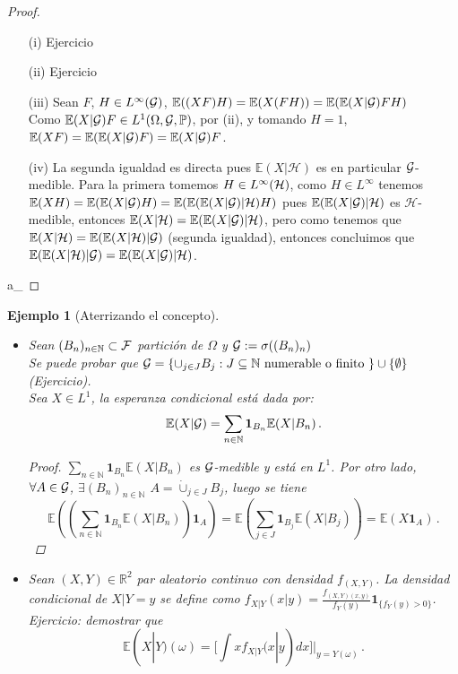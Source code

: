 \documentclass[letterpaper,11pt]{article} %
\theoremstyle{defbreak}
\newtheorem{example}{Ejemplo}[subsection]
\theoremstyle{propbreak}
\theoremstyle{remark}
\theoremstyle{break}
\def\R{\mathbb{R}}
\def\E{\mathbb{E}}
\def\P{\mathbb{P}}
\def\N{\mathbb{N}}
\def\ejercicio{\color{blue}Ejercicio\color{black}}
\def\beforeitemize{\leavevmode \vspace{-0.5\baselineskip}}
\def\gris{\color{mygray}}
\def\negro{\color{black}}
\def\findem{\null\hfill\color{white}a\color{black}_\square}
\begin{document}
\begin{proof}
\beforeitemize
\begin{enumerate} \gris
    \item[(i)] \ejercicio \gris
    \item[(ii)] \ejercicio \gris
    \item[(iii)] Sean $F$, $H\in L^\infty(\mathcal{G})$, $\E((X F) H)=\E(X(FH))=\E(\E(X|\G)F H)$
    \\ Como $\E(X|\G)F \in L^1(\Omega,\G,\P)$, por (ii), y tomando $H=1$,  $\E(X F)=\E(\E(X|\G)F)=\E(X|\G)F$.
    \item[(iv)] La segunda igualdad es directa pues $\E(X|\mathcal{H})$ es en particular $\mathcal{G}$-medible. Para la primera tomemos $H\in L^\infty(\mathcal{H})$, como $H\in L^\infty$ tenemos $\E(XH)=\E(\E(X|\G)H)=\E(\E(\E(X|\G)|\mathcal{H})H)$ pues $\E(\E(X|\G)|\mathcal{H})$ es $\mathcal{H}$-medible, entonces $\E(X|\mathcal{H})=\E(\E(X|\G)|\mathcal{H})$, pero como tenemos que $\E(X|\mathcal{H})=\E(\E(X|\mathcal{H})|\G)$ (segunda igualdad), entonces concluimos que $\E(\E(X|\mathcal{H})|\G)=\E(\E(X|\G)|\mathcal{H})$.
\end{enumerate}
\findem
\end{proof}
\begin{example}[Aterrizando el concepto]
\beforeitemize
\begin{itemize}
    \item Sean $(B_n)_{n\in\N}\subset\F$ partición de $\Omega$ y $\mathcal{G}:=\sigma((B_n)_n)$
    \\ Se puede probar que $\G=\{\cup_{j\in J}B_j:J\subseteq\N\mbox{ numerable o finito }\}\cup\{\emptyset\}$ (\ejercicio).
    \\ Sea $X\in L^1$, la esperanza condicional está dada por:
    $$ \E(X|\G)=\displaystyle\sum_{n\in\N}\mathbf{1}_{B_n}\E(X|B_n) \, .$$
    \begin{proof} \gris
    $\displaystyle\sum_{n\in\N}\mathbf{1}_{B_n}\E(X|B_n)$ es $\mathcal{G}$-medible y está en $L^1$. Por otro lado, $\forall A\in\mathcal{G}$, $\exists (B_n)_{n\in\N}$ $A=\displaystyle \dot\cup_{j\in J}B_j$, luego se tiene
    $$ \E((\displaystyle\sum_{n\in\N}\mathbf{1}_{B_n}\E(X|B_n))\mathbf{1}_A)=\E(\sum_{j\in J}\mathbf{1}_{B_j}\E(X|B_j))=\E(X \mathbf{1}_A) \, .$$
    \negro \end{proof}
    \item Sean $(X,Y)\in\R^2$ par aleatorio continuo con densidad $f_{(X,Y)}$. La densidad condicional de $X|Y=y$ se define como $\displaystyle f_{X|Y}(x|y) = \frac{f_{(X,Y)(x,y)}}{f_Y(y)}\mathbf{1}_{\{f_Y(y)>0\}}$.
    \\ \ejercicio: demostrar que 
    $$ \E(X|Y)(\omega) = [\displaystyle\int x f_{X|Y}(x|y)dx]|_{y=Y(\omega)} \, .$$
\end{itemize}
\end{example}
\end{document}
